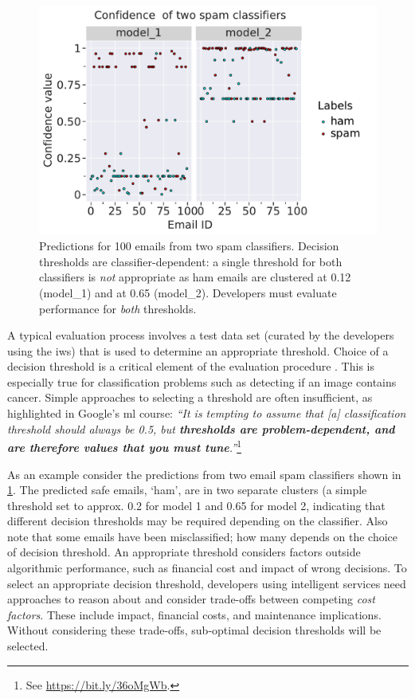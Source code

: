 \begin{figure}[t]
    \centering
    \includegraphics[width=.75\linewidth]{scatter.pdf}
    \caption[Example case study of evaluating model performance in two different models]{Predictions for 100 emails from two spam classifiers. Decision thresholds are classifier-dependent:  a single threshold for both classifiers is \textit{not} appropriate as ham emails are clustered at 0.12 (model\_1) and at 0.65 (model\_2). Developers must evaluate  performance for \textit{both} thresholds.}
    \label{fse-demo2020:fig:example}
\end{figure}

A typical evaluation process involves a test data set (curated by the developers using the \gls{iws}) that is used to determine an appropriate threshold. Choice of a decision threshold is a critical element of the evaluation procedure \citep{hardt2016equality}. This is especially true for classification problems such as detecting if an image contains cancer. Simple approaches to selecting a threshold are often insufficient, as highlighted in Google's \gls{ml} course: \textit{``It is tempting to assume that [a] classification threshold should always be 0.5, but \textbf{thresholds are problem-dependent, and are therefore values that you must tune}.''}\footnote{See \url{https://bit.ly/36oMgWb}.} 

As an example consider the predictions from two email spam classifiers shown in \cref{fse-demo2020:fig:example}. The predicted safe emails, `ham', are in two separate clusters (a simple threshold set to approx. 0.2 for model 1 and 0.65 for model 2, indicating that different decision thresholds may be required depending on the classifier. Also note that some emails have been misclassified; how many depends on the choice of decision threshold. An appropriate threshold considers factors outside algorithmic performance, such as financial cost and impact of wrong decisions. To select an appropriate decision threshold, developers using intelligent services need approaches to reason about and consider trade-offs between competing \textit{cost factors}. These include impact, financial costs, and maintenance implications. Without considering these trade-offs, sub-optimal decision thresholds will be selected.   

